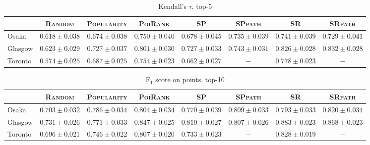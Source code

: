 \begin{table*}[!h]
\caption{Kendall's $\tau$, top-5}
\centering
\small
\setlength{\tabcolsep}{4pt} %
\begin{tabular}{l|cc|cc|ccc} \hline
 & \textsc{Random} & \textsc{Popularity} & \textsc{PoiRank} & \textsc{SP} & \textsc{SPpath} & \textsc{SR} & \textsc{SRpath} \\ \hline
Osaka & $0.618\pm0.038$ & $0.674\pm0.038$ & $\mathbf{0.750\pm0.040}$ & $0.678\pm0.045$ & $0.735\pm0.039$ & $\mathit{0.741\pm0.039}$ & $0.729\pm0.041$ \\
Glasgow & $0.623\pm0.029$ & $0.727\pm0.037$ & $0.801\pm0.030$ & $0.727\pm0.033$ & $0.743\pm0.031$ & $\mathit{0.826\pm0.028}$ & $\mathbf{0.832\pm0.028}$ \\
Toronto & $0.574\pm0.025$ & $0.687\pm0.025$ & $\mathit{0.754\pm0.023}$ & $0.662\pm0.027$ & $-$ & $\mathbf{0.778\pm0.023}$ & $-$ \\
\hline
\end{tabular}
\end{table*}

\begin{table*}[!h]
\caption{F$_1$ score on points, top-10}
\centering
\small
\setlength{\tabcolsep}{4pt} %
\begin{tabular}{l|cc|cc|ccc} \hline
 & \textsc{Random} & \textsc{Popularity} & \textsc{PoiRank} & \textsc{SP} & \textsc{SPpath} & \textsc{SR} & \textsc{SRpath} \\ \hline
Osaka & $0.703\pm0.032$ & $0.786\pm0.034$ & $0.804\pm0.034$ & $0.770\pm0.039$ & $\mathit{0.809\pm0.033}$ & $0.793\pm0.033$ & $\mathbf{0.820\pm0.031}$ \\
Glasgow & $0.731\pm0.026$ & $0.771\pm0.033$ & $0.847\pm0.025$ & $0.810\pm0.027$ & $0.807\pm0.026$ & $\mathbf{0.883\pm0.023}$ & $\mathit{0.868\pm0.023}$ \\
Toronto & $0.696\pm0.021$ & $0.746\pm0.022$ & $\mathit{0.807\pm0.020}$ & $0.733\pm0.023$ & $-$ & $\mathbf{0.828\pm0.019}$ & $-$ \\
\hline
\end{tabular}
\end{table*}

